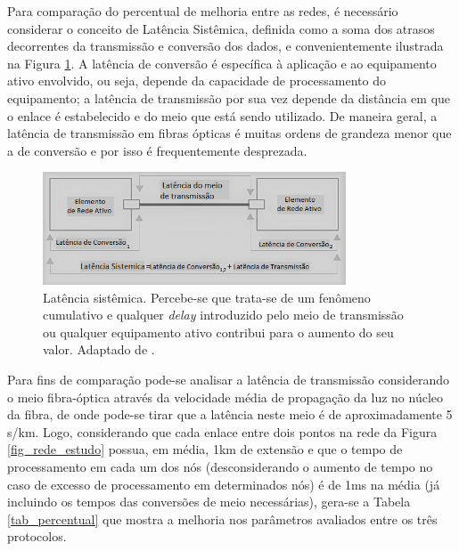 \documentclass[12pt]{article}
\begin{document}

Para comparação do percentual de melhoria entre as redes, é necessário considerar o conceito de Latência Sistêmica, definida como a soma dos atrasos decorrentes da transmissão e conversão dos dados, e convenientemente ilustrada na Figura \ref{fig_latencia_sistemica}. A latência de conversão é específica à aplicação e ao equipamento ativo envolvido, ou seja, depende da capacidade de processamento do equipamento; a latência de transmissão por sua vez depende da distância em que o enlace é estabelecido e do meio que está sendo utilizado. De maneira geral, a latência de transmissão em fibras ópticas é muitas ordens de grandeza menor que a de conversão e por isso é frequentemente desprezada.

\begin{figure} %
	\centering
	\includegraphics[width=9cm]{latency_systemic_PB}
	\caption{Latência sistêmica. Percebe-se que trata-se de um fenômeno cumulativo e qualquer \emph{delay} introduzido pelo meio de transmissão ou qualquer equipamento ativo contribui para o aumento do seu valor. Adaptado de \cite{Art_Coffey}.}
	\label{fig_latencia_sistemica}
\end{figure}

Para fins de comparação pode-se analisar a latência de transmissão considerando o meio fibra-óptica através da velocidade média de propagação da luz no núcleo da fibra, de onde pode-se tirar que a latência neste meio é de aproximadamente 5 \textmu s/km. Logo, considerando que cada enlace entre dois pontos na rede da Figura \ref{fig_rede_estudo} possua, em média, 1km de extensão e que o tempo de processamento em cada um dos nós (desconsiderando o aumento de tempo no caso de excesso de processamento em determinados nós) é de 1ms na média (já incluindo os tempos das conversões de meio necessárias), gera-se a Tabela \ref{tab_percentual} que mostra a melhoria nos parâmetros avaliados entre os três protocolos.
\end{document}
